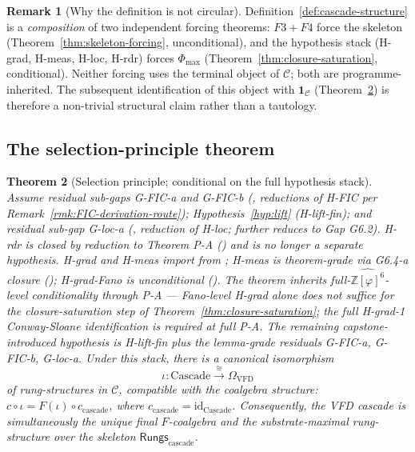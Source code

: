 \documentclass[11pt, a4paper]{amsart}
\newtheorem{theorem}{Theorem}[section]
\theoremstyle{definition}
\newtheorem{remark}[theorem]{Remark}
\newcommand{\Z}{\mathbb{Z}}
\newcommand{\Rungs}{\mathsf{Rungs}}
\newcommand{\catC}{\mathcal{C}}
\newcommand{\Omegacap}{\Omega_{\mathrm{VFD}}}
\begin{document}
\begin{remark}[Why the definition is not circular]
\label{rmk:cascade-not-circular}
Definition~\ref{def:cascade-structure} is a \emph{composition}
of two independent forcing theorems: $F3+F4$ force the
skeleton (Theorem~\ref{thm:skeleton-forcing}, unconditional),
and the hypothesis stack (H-grad, H-meas, H-loc, H-rdr) forces
$\Phi_{\max}$ (Theorem~\ref{thm:closure-saturation},
conditional). Neither forcing uses the terminal object of
$\catC$; both are programme-inherited. The subsequent
identification of this object with $\mathbf{1}_\catC$
(Theorem~\ref{thm:selection}) is therefore a non-trivial
structural claim rather than a tautology.
\end{remark}

\subsection{The selection-principle theorem}

\begin{theorem}[Selection principle; conditional on the full
  hypothesis stack]
\label{thm:selection}
Assume residual sub-gaps G-FIC-a and G-FIC-b
(\cite{CascadeHFICClosure}, reductions of H-FIC per
Remark~\ref{rmk:FIC-derivation-route});
Hypothesis~\ref{hyp:lift} (H-lift-fin); and residual sub-gap
G-loc-a (\cite{CascadeHlocClosure}, reduction of H-loc;
further reduces to Gap G6.2). H-rdr is closed by reduction to
Theorem P-A (\cite{CascadeHrdrClosure}) and is no longer a
separate hypothesis. H-grad and H-meas import from
\cite{CascadeAccessPrinciple}; H-meas is theorem-grade via
G6.4-a closure (\cite{CascadeG64aClosure}); H-grad-Fano is
unconditional (\cite{CascadeFanoLift}). \emph{The theorem
inherits full-$\widehat{\Z[\varphi]^6}$-level conditionality
through P-A} — Fano-level H-grad alone does not suffice for
the closure-saturation step of
Theorem~\ref{thm:closure-saturation}; the full H-grad-1
Conway-Sloane identification is required at full P-A. The
remaining capstone-introduced hypothesis is H-lift-fin plus
the lemma-grade residuals G-FIC-a, G-FIC-b, G-loc-a. Under
this stack, there is a canonical isomorphism
\[
    \iota \colon \mathrm{Cascade}
    \xrightarrow{\;\cong\;} \Omegacap
\]
of rung-structures in $\catC$, compatible with the coalgebra
structure: $c \circ \iota = F(\iota) \circ c_{\mathrm{cascade}}$,
where $c_{\mathrm{cascade}} = \mathrm{id}_{\mathrm{Cascade}}$.
Consequently, the VFD cascade is simultaneously the unique
final $F$-coalgebra and the substrate-maximal rung-structure
over the skeleton $\Rungs_{\mathrm{cascade}}$.
\end{theorem}
\end{document}
